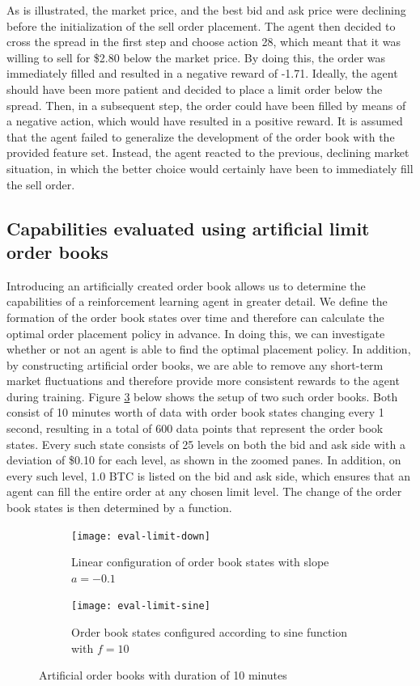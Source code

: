 As is illustrated, the market price, and the best bid and ask price were declining before the initialization of the sell order placement. 
The agent then decided to cross the spread in the first step and choose action 28, which meant that it was willing to sell for \$2.80 below the market price.
By doing this, the order was immediately filled and resulted in a negative reward of -1.71.
Ideally, the agent should have been more patient and decided to place a limit order below the spread.
Then, in a subsequent step, the order could have been filled by means of a negative action, which would have resulted in a positive reward.
It is assumed that the agent failed to generalize the development of the order book with the provided feature set.
Instead, the agent reacted to the previous, declining market situation, in which  the better choice would certainly have been to immediately fill the sell order.

\subsection{Capabilities evaluated using artificial limit order books}

Introducing an artificially created order book allows us to determine the capabilities of a reinforcement learning agent in greater detail.
We define the formation of the order book states over time and therefore can calculate the optimal order placement policy in advance.
In doing this, we can investigate whether or not an agent is able to find the optimal placement policy.
In addition, by constructing artificial order books, we are able to remove any short-term market fluctuations and therefore provide more consistent rewards to the agent during training.
Figure \ref{fig:eval-limit-artificial} below shows the setup of two such order books.
Both consist of 10 minutes worth of data with order book states changing every 1 second, resulting in a total of 600 data points that represent the order book states.
Every such state consists of 25 levels on both the bid and ask side with a deviation of \$0.10 for each level, as shown in the zoomed panes.
In addition, on every such level, 1.0 BTC is listed on the bid and ask side, which ensures that an agent can fill the entire order at any chosen limit level.
The change of the order book states is then determined by a function.
\begin{figure}[H]
    \centering
    \begin{subfigure}[b]{0.45\textwidth}
        \texttt{[image: eval-limit-down]}
        \caption{Linear configuration of order book states with slope $a=-0.1$}
        \label{fig:eval-limit-down}
    \end{subfigure}
    \begin{subfigure}[b]{0.45\textwidth}
        \texttt{[image: eval-limit-sine]}
        \caption{Order book states configured according to sine function with $f=10$}
        \label{fig:eval-limit-sine}
    \end{subfigure}
    \caption{Artificial order books with duration of 10 minutes}\label{fig:eval-limit-artificial}
\end{figure}

